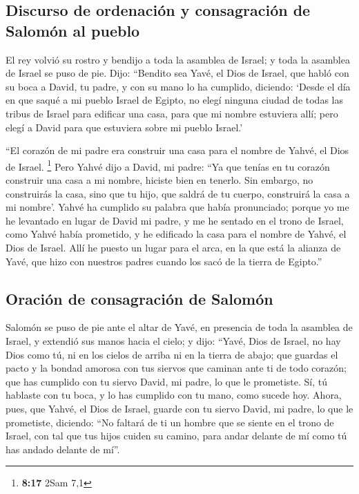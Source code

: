 \begin{paracol}{2}
\hypertarget{discurso-de-ordenaciuxf3n-y-consagraciuxf3n-de-salomuxf3n-al-pueblo}{%
\subsection{Discurso de ordenación y consagración de Salomón al
pueblo}\label{discurso-de-ordenaciuxf3n-y-consagraciuxf3n-de-salomuxf3n-al-pueblo}}

 El rey volvió su rostro y bendijo a toda la asamblea de
Israel; y toda la asamblea de Israel se puso de pie. 
Dijo: ``Bendito sea Yavé, el Dios de Israel, que habló con su boca a
David, tu padre, y con su mano lo ha cumplido, diciendo: 
`Desde el día en que saqué a mi pueblo Israel de Egipto, no elegí
ninguna ciudad de todas las tribus de Israel para edificar una casa,
para que mi nombre estuviera allí; pero elegí a David para que estuviera
sobre mi pueblo Israel.'

 ``El corazón de mi padre era construir una casa para el
nombre de Yahvé, el Dios de Israel. \footnote{\textbf{8:17} 2Sam 7,1}
 Pero Yahvé dijo a David, mi padre: ``Ya que tenías en tu
corazón construir una casa a mi nombre, hiciste bien en tenerlo.
 Sin embargo, no construirás la casa, sino que tu hijo,
que saldrá de tu cuerpo, construirá la casa a mi nombre'.
 Yahvé ha cumplido su palabra que había pronunciado;
porque yo me he levantado en lugar de David mi padre, y me he sentado en
el trono de Israel, como Yahvé había prometido, y he edificado la casa
para el nombre de Yahvé, el Dios de Israel.  Allí he
puesto un lugar para el arca, en la que está la alianza de Yavé, que
hizo con nuestros padres cuando los sacó de la tierra de Egipto.''

\hypertarget{oraciuxf3n-de-consagraciuxf3n-de-salomuxf3n}{%
\subsection{Oración de consagración de
Salomón}\label{oraciuxf3n-de-consagraciuxf3n-de-salomuxf3n}}

 Salomón se puso de pie ante el altar de Yavé, en
presencia de toda la asamblea de Israel, y extendió sus manos hacia el
cielo;  y dijo: ``Yavé, Dios de Israel, no hay Dios como
tú, ni en los cielos de arriba ni en la tierra de abajo; que guardas el
pacto y la bondad amorosa con tus siervos que caminan ante ti de todo
corazón;  que has cumplido con tu siervo David, mi padre,
lo que le prometiste. Sí, tú hablaste con tu boca, y lo has cumplido con
tu mano, como sucede hoy.  Ahora, pues, que Yahvé, el
Dios de Israel, guarde con tu siervo David, mi padre, lo que le
prometiste, diciendo: ``No faltará de ti un hombre que se siente en el
trono de Israel, con tal que tus hijos cuiden su camino, para andar
delante de mí como tú has andado delante de mí''.


\end{paracol}
